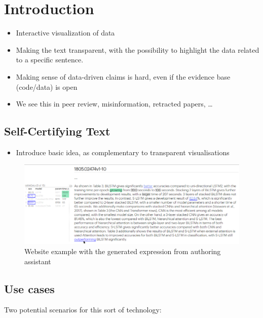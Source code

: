 \section{Introduction}

\lstset{
    aboveskip=-7pt,
    belowskip=-8.5pt,
    xleftmargin=0pt,
    xrightmargin=0pt
}

\begin{itemize}
    \item Interactive visualization of data
    \item Making the text transparent, with the possibility to highlight the data related to a specific sentence.
    \item Making sense of data-driven claims is hard, even if the evidence base (code/data) is open
    \item We see this in peer review, misinformation, retracted papers, …
\end{itemize}

\subsection{Self-Certifying Text}

\begin{itemize}
    \item Introduce basic idea, as complementary to transparent visualisations
\end{itemize}

\begin{figure}
    \centering
    \includegraphics[width=\linewidth]{fig/scigen-mr-1906.02780-10.png}
    \caption{Website example with the generated expression from authoring assistant}\label{fig:scigen-example-website}
\end{figure}


\subsection{Use cases}
Two potential scenarios for this sort of technology:


